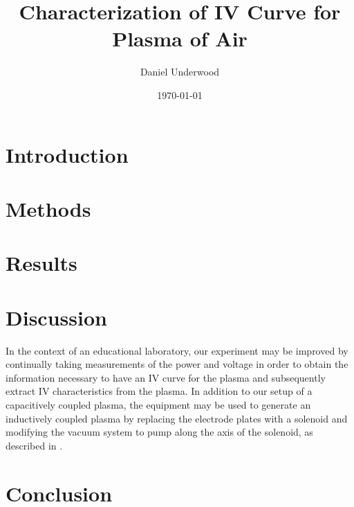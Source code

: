 \documentclass[reprint]{revtex4-1}
\begin{document}
\title{Characterization of IV Curve for Plasma of Air}
\author{Daniel Underwood}
\date{\today}

\begin{abstract}

\end{abstract}
\maketitle

\section{Introduction}

\section{Methods}

\section{Results}

\section{Discussion}

In the context of an educational laboratory, our experiment may be improved by continually taking measurements of the power and voltage in order to obtain the information necessary to have an IV curve for the plasma and subsequently extract IV characteristics from the plasma. In addition to our setup of a capacitively coupled plasma,  the equipment may be used to generate an inductively coupled plasma by replacing the electrode plates with a solenoid and modifying the vacuum system to pump along the axis of the solenoid, as described in \cite{Jiayin2010}. 

\section{Conclusion}


\end{document}
